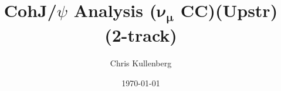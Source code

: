 \title{CohJ/$\psi$ Analysis ($\boldsymbol{\nu_\mu}$ \textbf{CC})(\textbf{Upstr})(\textbf{2-track})}
\author{Chris Kullenberg}
\date{\today}
